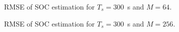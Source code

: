 \documentclass[../zhang_thesis.tex]{subfiles}
\begin{document}
\begin{figure}[h]
\centering
%
\caption{RMSE of SOC estimation for $T_s=300$~s and $M=64$.}
\label{fig:rmse_300_64}
\end{figure}

\begin{figure}
\centering
%
\caption{RMSE of SOC estimation for $T_s=300$~s and $M=256$.}
\label{fig:rmse_300_256}
\end{figure}
\end{document}
